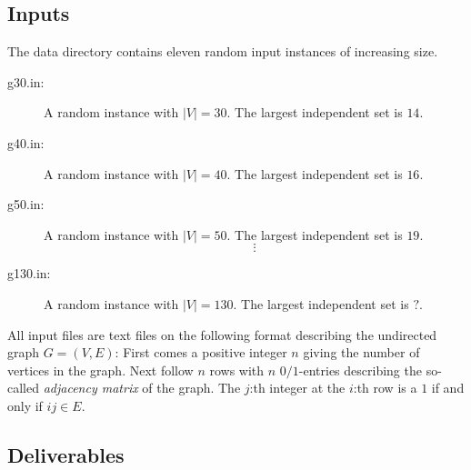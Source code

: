 \documentclass{tufte-handout}
\begin{document}
\subsection{ Inputs}

The data directory contains eleven random input instances of increasing size. 

\begin{description}
\item[ g30.in:] A random instance with $|V|=30$. The largest independent set is $14$.
\item[ g40.in:] A random instance with $|V|=40$. The largest independent set is $16$.
\item[ g50.in:] A random instance with $|V|=50$. The largest independent set is $19$.
\[\vdots\]
\item[ g130.in:]  A random instance with $|V|=130$. The largest independent set is $?$.

\end{description}

All input files are text files on the following format describing the undirected graph $G=(V,E)$:
First comes a positive integer $n$ giving the number of vertices in the graph. Next follow $n$ rows
with $n$ $0/1$-entries describing the so-called \emph{adjacency matrix} of the graph. The $j$:th integer at the $i$:th row is a $1$ if and only if $ij\in E$.

\subsection{ Deliverables}
\end{document}
